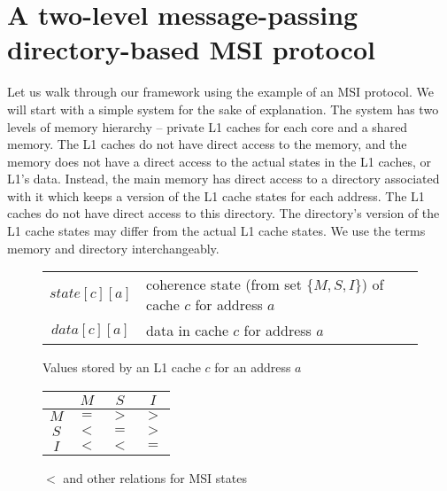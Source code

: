 \section{A two-level message-passing directory-based MSI protocol}
\label{sec:msi}

\newcommand{\fourAngle}[6]{\text{$#1\langle#2\rightarrow#3,#4,#5\rightarrow#6\rangle$}}
\newcommand{\threeAngle}[5]{\text{$#1\langle#2\rightarrow#3,#4,#5\rangle$}}

\newcommand{\Req}[4]{\threeAngle{Req}{#1}{#2}{#3}{#4}}
\newcommand{\Resp}[4]{\threeAngle{Resp}{#1}{#2}{#3}{#4}}

\newcommand{\msg}[5]{\text{$#1 \langle #2 \rightarrow #3, #4, #5 \rangle$}}
%

Let us walk through our framework using the example of an MSI protocol.  We will
start with a simple system for the sake of explanation.  The system has two
levels of memory hierarchy -- private L1 caches for each core and a shared
memory. The L1 caches do not have direct access to the memory, and the memory
does not have a direct access to the actual states in the  L1 caches, or L1's
data. Instead, the main memory has direct access to a directory associated with
it which keeps a version of the L1 cache states for each address. The L1 caches
do not have direct access to this directory. The directory's version of the L1
cache states may differ from the actual L1 cache states. We use the terms memory
and directory interchangeably.

\begin{figure}
\begin{tabularx}{\linewidth}{|cX|}
\hline
$state[c][a]$ & coherence state (from set $\{M, S, I\}$) of cache $c$ for address $a$\\
$data[c][a]$ & data in cache $c$ for address $a$\\
\hline \end{tabularx}
\caption{Values stored by an L1 cache $c$ for an address $a$}
\label{table:lineinfo}
\end{figure}

\begin{wrapfigure}{r}{.4\linewidth}
\centering
\begin{tabular}{|c|ccc|}
\hline
& $M$ & $S$ & $I$\\
\hline
$M$ & $=$ & $>$ & $>$\\
$S$ & $<$ & $=$ & $>$\\
$I$ & $<$ & $<$ & $=$\\
\hline
\end{tabular}
\caption{$<$ and other relations for MSI states}
\label{msi<}
\end{wrapfigure}

